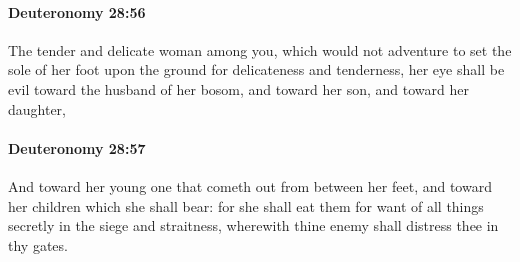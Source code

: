 		\paragraph{Deuteronomy 28:56} %
			\label{DEUTERONOMY-28-56}

			The tender and delicate woman among you, which would not adventure to set the sole of her foot upon the ground for delicateness and tenderness, her eye shall be evil toward the husband of her bosom, and toward her son, and toward her daughter,


		\paragraph{Deuteronomy 28:57} %
			\label{DEUTERONOMY-28-57}

			And toward her young one that cometh out from between her feet, and toward her children which she shall bear: for she shall eat them for want of all things secretly in the siege and straitness, wherewith thine enemy shall distress thee in thy gates.

